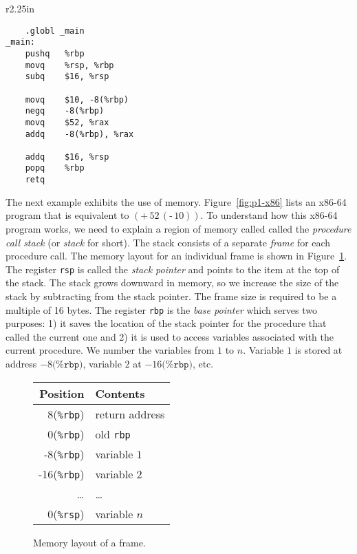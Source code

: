 \documentclass[12pt]{book}
\newcommand{\key}[1]{\texttt{#1}}
\newcommand{\UNIOP}[2]{(\key{#1}\,#2)}
\newcommand{\BINOP}[3]{(\key{#1}\,#2\,#3)}
\begin{document}
\begin{wrapfigure}{r}{2.25in}
\begin{lstlisting}
	.globl _main
_main:
	pushq	%rbp
	movq	%rsp, %rbp
	subq	$16, %rsp

	movq	$10, -8(%rbp)
	negq	-8(%rbp)
	movq	$52, %rax
	addq	-8(%rbp), %rax

	addq	$16, %rsp
	popq	%rbp
	retq
\end{lstlisting}
\caption{An x86-64 program equivalent to $\BINOP{+}{52}{\UNIOP{-}{10} }$.}
\label{fig:p1-x86}
\end{wrapfigure}

The next example exhibits the use of memory.  Figure~\ref{fig:p1-x86}
lists an x86-64 program that is equivalent to $\BINOP{+}{52}{
  \UNIOP{-}{10} }$. To understand how this x86-64 program works, we
need to explain a region of memory called called the \emph{procedure
  call stack} (or \emph{stack} for short). The stack consists of a
separate \emph{frame} for each procedure call. The memory layout for
an individual frame is shown in Figure~\ref{fig:frame}.  The register
\key{rsp} is called the \emph{stack pointer} and points to the item at
the top of the stack. The stack grows downward in memory, so we
increase the size of the stack by subtracting from the stack
pointer. The frame size is required to be a multiple of 16 bytes. The
register \key{rbp} is the \emph{base pointer} which serves two
purposes: 1) it saves the location of the stack pointer for the
procedure that called the current one and 2) it is used to access
variables associated with the current procedure. We number the
variables from $1$ to $n$. Variable $1$ is stored at address
$-8\key{(\%rbp)}$, variable $2$ at $-16\key{(\%rbp)}$, etc.

\begin{figure}[tbp]
\centering
\begin{tabular}{|r|l|} \hline
Position & Contents \\ \hline
8(\key{\%rbp}) & return address \\
0(\key{\%rbp}) & old \key{rbp} \\
-8(\key{\%rbp}) & variable $1$ \\
-16(\key{\%rbp}) & variable $2$ \\
 \ldots  & \ldots \\
0(\key{\%rsp}) & variable $n$\\ \hline
\end{tabular}

\caption{Memory layout of a frame.}
\label{fig:frame}
\end{figure}
\end{document}

